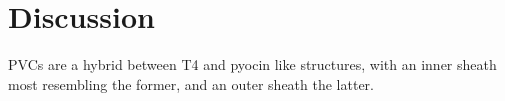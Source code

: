 






















\section{Discussion}
PVCs are a hybrid between T4 and pyocin like structures, with an inner sheath most resembling the former, and an outer sheath the latter.








